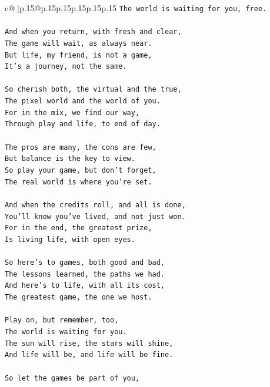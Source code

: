 \documentclass{article}
\begin{document}
{\begin{supertabular}{c@{$\;$}|p{.15\linewidth}@{}p{.15\linewidth}p{.15\linewidth}p{.15\linewidth}p{.15\linewidth}p{.15\linewidth}}
{{{\texttt{The world is waiting for you, free.  } \\
\\ 
\texttt{And when you return, with fresh and clear,  } \\
\texttt{The game will wait, as always near.  } \\
\texttt{But life, my friend, is not a game,  } \\
\texttt{It's a journey, not the same.  } \\
\\ 
\texttt{So cherish both, the virtual and the true,  } \\
\texttt{The pixel world and the world of you.  } \\
\texttt{For in the mix, we find our way,  } \\
\texttt{Through play and life, to end of day.  } \\
\\ 
\texttt{The pros are many, the cons are few,  } \\
\texttt{But balance is the key to view.  } \\
\texttt{So play your game, but don't forget,  } \\
\texttt{The real world is where you're set.  } \\
\\ 
\texttt{And when the credits roll, and all is done,  } \\
\texttt{You'll know you've lived, and not just won.  } \\
\texttt{For in the end, the greatest prize,  } \\
\texttt{Is living life, with open eyes.  } \\
\\ 
\texttt{So here's to games, both good and bad,  } \\
\texttt{The lessons learned, the paths we had.  } \\
\texttt{And here's to life, with all its cost,  } \\
\texttt{The greatest game, the one we host.  } \\
\\ 
\texttt{Play on, but remember, too,  } \\
\texttt{The world is waiting for you.  } \\
\texttt{The sun will rise, the stars will shine,  } \\
\texttt{And life will be, and life will be fine.  } \\
\\ 
\texttt{So let the games be part of you,  } \\
}}}
\end{supertabular}}
\end{document}
